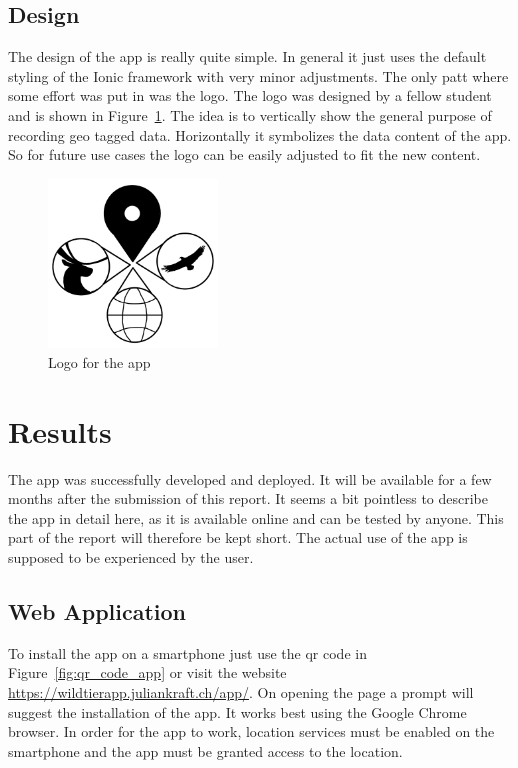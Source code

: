 \documentclass{josis}
\begin{document}
\subsection{Design}

The design of the app is really quite simple. In general it just uses the default styling of the Ionic framework with very minor adjustments.
The only patt where some effort was put in was the logo. The logo was designed by a fellow student and is shown in Figure~\ref{fig:logo}.
The idea is to vertically show the general purpose of recording geo tagged data. Horizontally it symbolizes the data content of the app.
So for future use cases the logo can be easily adjusted to fit the new content.
\begin{figure}[tbh]
    \centering
    \includegraphics[width=0.4\textwidth]{images/logo_app.png}
    \caption{Logo for the app}\label{fig:logo}
\end{figure}

\section{Results}

The app was successfully developed and deployed. It will be available for a few months after the submission of this report.
It seems a bit pointless to describe the app in detail here, as it is available online and can be tested by anyone.
This part of the report will therefore be kept short. The actual use of the app is supposed to be experienced by the user.

\subsection{Web Application}

To install the app on a smartphone just use the qr code in Figure~\ref{fig:qr_code_app} or visit 
the website \url{https://wildtierapp.juliankraft.ch/app/}. On opening the page a prompt will suggest the installation of the app.
It works best using the Google Chrome browser. In order for the app to work, location services must be enabled on the smartphone
and the app must be granted access to the location.
\end{document}
